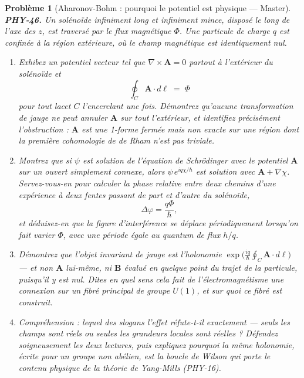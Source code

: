 \documentclass[11pt]{article}
\newtheorem{problem}{Problème}
\begin{document}
\begin{problem}[{Aharonov-Bohm : pourquoi le potentiel est physique --- Master}]
\textbf{PHY-46.} Un solénoïde infiniment long et infiniment mince, disposé le long de l'axe des
$z$, est traversé par le flux magnétique $\Phi$. Une particule de charge $q$ est confinée à
la région extérieure, où le champ magnétique est identiquement nul.
\begin{enumerate}
\item[(a)] Exhibez un potentiel vecteur tel que $\nabla\times\mathbf{A} = 0$ partout à l'extérieur du
solénoïde et
\[ \oint_{C} \mathbf{A}\cdot d\boldsymbol{\ell} \;=\; \Phi \]
pour tout lacet $C$ l'encerclant une fois. Démontrez qu'aucune transformation de jauge ne peut
annuler $\mathbf{A}$ sur tout l'extérieur, et identifiez précisément l'obstruction :
$\mathbf{A}$ est une 1-forme fermée mais non exacte sur une région dont la première cohomologie
de de Rham n'est pas triviale.
\item[(b)] Montrez que si $\psi$ est solution de l'équation de Schrödinger avec le potentiel
$\mathbf{A}$ sur un ouvert simplement connexe, alors $\psi\,e^{iq\chi/\hbar}$ est solution
avec $\mathbf{A}+\nabla\chi$. Servez-vous-en pour calculer la phase relative entre deux chemins
d'une expérience à deux fentes passant de part et d'autre du solénoïde,
\[ \Delta\varphi = \frac{q\Phi}{\hbar}, \]
et déduisez-en que la figure d'interférence se déplace périodiquement lorsqu'on fait varier
$\Phi$, avec une période égale au quantum de flux $h/q$.
\item[(c)] Démontrez que l'objet invariant de jauge est l'holonomie
$\exp\bigl(\tfrac{iq}{\hbar}\oint_{C}\mathbf{A}\cdot d\boldsymbol{\ell}\bigr)$ --- et non
$\mathbf{A}$ lui-même, ni $\mathbf{B}$ évalué en quelque point du trajet de la particule,
puisqu'il y est nul. Dites en quel sens cela fait de l'électromagnétisme une connexion sur un
fibré principal de groupe $U(1)$, et sur quoi ce fibré est construit.
\item[(d)] Compréhension : lequel des slogans l'effet réfute-t-il exactement --- \og{} seuls les champs sont
réels \fg{} ou \og{} seules les grandeurs locales sont réelles \fg{} ? Défendez soigneusement les deux
lectures, puis expliquez pourquoi la même holonomie, écrite pour un groupe non abélien, est la
boucle de Wilson qui porte le contenu physique de la théorie de Yang-Mills (PHY-16).
\end{enumerate}

\end{problem}
\end{document}
